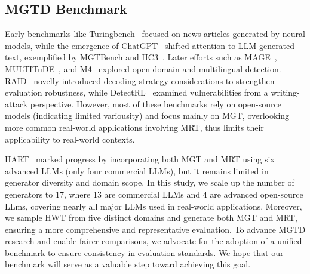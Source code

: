 \subsection{MGTD Benchmark}
Early benchmarks like Turingbench~\cite{turingbench} focused on news articles generated by neural models, while the emergence of ChatGPT~\cite{instructGPT} shifted attention to LLM-generated text, exemplified by MGTBench\cite{mgtbench} and HC3~\cite{hc3}. 
%
Later efforts such as MAGE~\cite{mage}, MULTITuDE~\cite{multitude}, and M4~\cite{m4bench} explored open-domain and multilingual detection.
%
RAID~\cite{raid} novelly introduced decoding strategy considerations to strengthen evaluation robustness, while DetectRL~\cite{detectrl} examined vulnerabilities from a writing-attack perspective.
%
However, most of these benchmarks rely on open-source models (indicating limited variousity) and focus mainly on MGT, overlooking more common real-world applications involving MRT, thus limits their applicability to real-world contexts.

HART~\cite{hart} marked progress by incorporating both MGT and MRT using six advanced LLMs (only four commercial LLMs), but it remains limited in generator diversity and domain scope.
%
In this study, we scale up the number of generators to 17, where 13 are commercial LLMs and 4 are advanced open-source LLms, covering nearly all major LLMs used in real-world applications.
%
Moreover, we sample HWT from five distinct domains and generate both MGT and MRT, ensuring a more comprehensive and representative evaluation.
%
To advance MGTD research and enable fairer comparisons, we advocate for the adoption of a unified benchmark to ensure consistency in evaluation standards. We hope that our benchmark will serve as a valuable step toward achieving this goal.